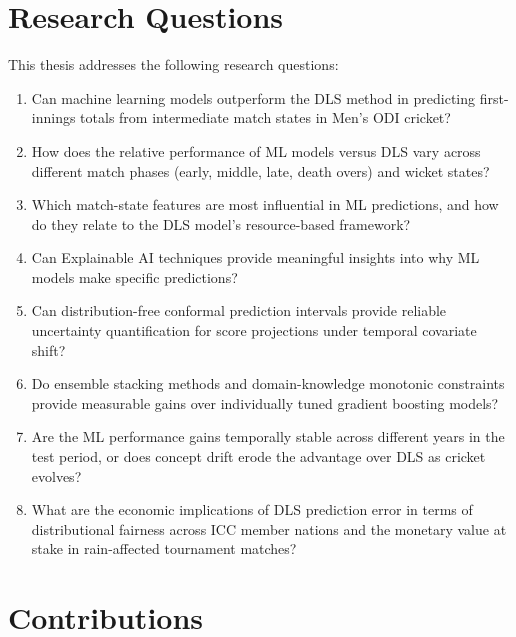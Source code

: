 \documentclass[12pt,a4paper,oneside]{report}
\begin{document}
\section{Research Questions}

This thesis addresses the following research questions:

\begin{enumerate}
    \item[\textbf{RQ1}:] Can machine learning models outperform the DLS method in predicting first-innings totals from intermediate match states in Men's ODI cricket?

    \item[\textbf{RQ2}:] How does the relative performance of ML models versus DLS vary across different match phases (early, middle, late, death overs) and wicket states?

    \item[\textbf{RQ3}:] Which match-state features are most influential in ML predictions, and how do they relate to the DLS model's resource-based framework?

    \item[\textbf{RQ4}:] Can Explainable AI techniques provide meaningful insights into why ML models make specific predictions?

    \item[\textbf{RQ5}:] Can distribution-free conformal prediction intervals provide reliable uncertainty quantification for score projections under temporal covariate shift?

    \item[\textbf{RQ6}:] Do ensemble stacking methods and domain-knowledge monotonic constraints provide measurable gains over individually tuned gradient boosting models?

    \item[\textbf{RQ7}:] Are the ML performance gains temporally stable across different years in the test period, or does concept drift erode the advantage over DLS as cricket evolves?

    \item[\textbf{RQ8}:] What are the economic implications of DLS prediction error in terms of distributional fairness across ICC member nations and the monetary value at stake in rain-affected tournament matches?
\end{enumerate}

\section{Contributions}
\end{document}
